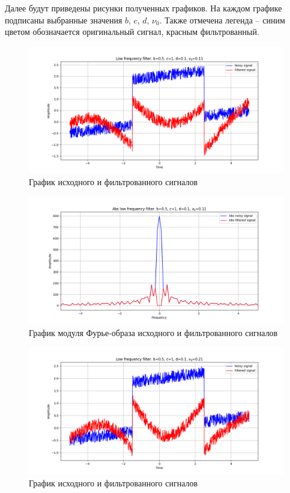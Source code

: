 \documentclass[a4paper, 12pt]{article}
\begin{document}
    Далее будут приведены рисунки полученных графиков. На каждом графике подписаны выбранные значения $b,\,c,\,d,\,\nu_0$. 
    Также отмечена легенда -- синим цветом обозначается оригинальный сигнал, красным фильтрованный.
    \begin{figure}[!htb]
        \centering
        \includegraphics[scale=0.485]{1_u_flt_u_nolow.png}
        \captionsetup{skip=0pt}
        \caption{График исходного и фильтрованного сигналов}
        \label{fig:fig27}
    \end{figure}
    \begin{figure}[!htb]
        \centering
        \includegraphics[scale=0.485]{1_abs_u_U_nolow.png}
        \captionsetup{skip=0pt}
        \caption{График модуля Фурье-образа исходного и фильтрованного сигналов}
        \label{fig:fig28}
    \end{figure}
    \begin{figure}[!htb]
        \centering
        \includegraphics[scale=0.485]{2_u_flt_u_nolow.png}
        \captionsetup{skip=0pt}
        \caption{График исходного и фильтрованного сигналов}
        \label{fig:fig29}
    \end{figure}
\end{document}

